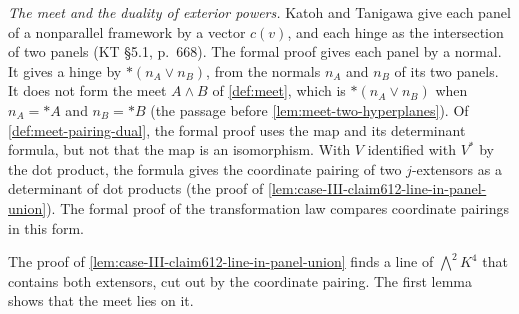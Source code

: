 \begin{remark}
  \emph{The meet and the duality of exterior powers.} Katoh and Tanigawa
  give each panel of a nonparallel framework by a vector $c(v)$, and each
  hinge as the intersection of two panels (KT \S5.1, p.~668). The formal
  proof gives each panel by a normal. It gives a hinge by
  $*(n_A \vee n_B)$, from the normals $n_A$ and $n_B$ of its two panels.
  It does not form the meet $A \wedge B$ of \cref{def:meet}, which is
  $*(n_A \vee n_B)$ when $n_A = {*A}$ and $n_B = {*B}$ (the passage
  before \cref{lem:meet-two-hyperplanes}). Of
  \cref{def:meet-pairing-dual}, the formal proof uses the map and its
  determinant formula, but not that the map is an isomorphism. With $V$
  identified with $V^*$ by the dot product, the formula gives the
  coordinate pairing of two $j$-extensors as a determinant of dot
  products (the proof of \cref{lem:case-III-claim612-line-in-panel-union}).
  The formal proof of the transformation law compares coordinate
  pairings in this form.
\end{remark}

The proof of \cref{lem:case-III-claim612-line-in-panel-union} finds a
line of $\bigwedge^2 K^4$ that contains both extensors, cut out by the
coordinate pairing. The first lemma shows that
the meet lies on it.

